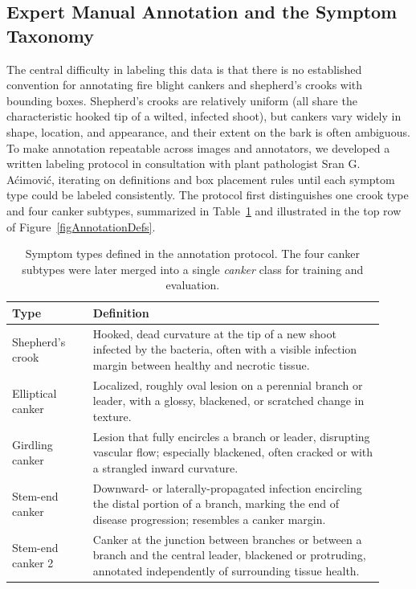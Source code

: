 \subsection{Expert Manual Annotation and the Symptom Taxonomy}
\label{secManualAnnotation}

The central difficulty in labeling this data is that there is no
established convention for annotating fire blight cankers and
shepherd's crooks with bounding boxes.
Shepherd's crooks are relatively uniform (all share the
characteristic hooked tip of a wilted, infected shoot), but cankers
vary widely in shape, location, and appearance, and their extent on
the bark is often ambiguous.
To make annotation repeatable across images and annotators, we
developed a written labeling protocol in consultation with plant
pathologist Sr\dj{}an G. A\'{c}imovi\'{c}, iterating on definitions and box
placement rules until each symptom type could be labeled
consistently.
The protocol first distinguishes one crook type and four canker
subtypes, summarized in Table~\ref{tabSymptomTypes} and illustrated in
the top row of Figure~\ref{figAnnotationDefs}.

\begin{table}[h]
    \centering
    \caption{Symptom types defined in the annotation protocol. The
             four canker subtypes were later merged into a single
             \emph{canker} class for training and evaluation.}
    \label{tabSymptomTypes}
    \begin{tabular}{|p{0.2\linewidth}|p{0.72\linewidth}|}
        \hline
        Type & Definition \\
        \hline
        Shepherd's crook & Hooked, dead curvature at the tip of a
                           new shoot infected by the bacteria, often
                           with a visible infection margin between
                           healthy and necrotic tissue. \\
        \hline
        Elliptical canker & Localized, roughly oval lesion on a
                            perennial branch or leader, with a glossy,
                            blackened, or scratched change in texture. \\
        \hline
        Girdling canker   & Lesion that fully encircles a branch or
                            leader, disrupting vascular flow;
                            especially blackened, often cracked or with
                            a strangled inward curvature. \\
        \hline
        Stem-end canker   & Downward- or laterally-propagated
                            infection encircling the distal portion of
                            a branch, marking the end of disease
                            progression; resembles a canker margin. \\
        \hline
        Stem-end canker 2 & Canker at the junction between branches or
                            between a branch and the central leader,
                            blackened or protruding, annotated
                            independently of surrounding tissue health. \\
        \hline
    \end{tabular}
\end{table}

